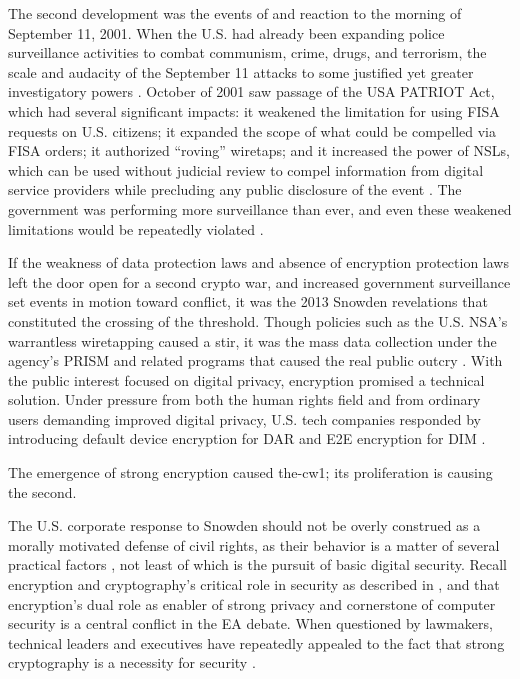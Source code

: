The second development was the events of and reaction to the morning of September 11, 2001. When the U.S. had already
been expanding police surveillance activities to combat communism, crime, drugs, and terrorism, the scale and audacity
of the September 11 attacks to some justified yet greater investigatory powers \cite{bloss_escalating_2007}. October of
2001 saw passage of the USA PATRIOT Act, which had several significant impacts: it weakened the limitation for using
\ac{FISA} requests on U.S. citizens; it expanded the scope of what could be compelled via \ac{FISA} orders; it
authorized ``roving'' wiretaps; and it increased the power of \acp{NSL}, which can be used without judicial review to
compel information from digital service providers while precluding any public disclosure of the event
\cite{sensenbrenner_2001} \cite{shamsi_2011}. The government was performing more surveillance than ever, and even these
weakened limitations would be repeatedly violated \cite{shamsi_2011} \cite{tucker_2020}.

If the weakness of data protection laws and absence of encryption protection laws left the door open for a second crypto
war, and increased government surveillance set events in motion toward conflict, it was the 2013 Snowden revelations
that constituted the crossing of the threshold. Though policies such as the U.S. \ac{NSA}'s warrantless wiretapping
caused a stir, it was the mass data collection under the agency's \ac{PRISM} and related programs that caused the real
public outcry \cite{landau_making_2013}. With the public interest focused on digital privacy, encryption promised a
technical solution. Under pressure from both the human rights field and from ordinary users demanding improved digital
privacy, U.S. tech companies responded by introducing default device encryption for \acl{DAR} and \acl{E2E} encryption
for \acl{DIM} \cite{treguer_us_2018}.

The emergence of strong encryption caused \ac{the-cw1}; its proliferation is causing the second.

The U.S. corporate response to Snowden should not be overly construed as a morally motivated defense of civil rights, as
their behavior is a matter of several practical factors \cite{treguer_us_2018}, not least of which is the pursuit of
basic digital security. Recall encryption and cryptography's critical role in security as described in
, and that encryption's dual role as enabler of strong privacy and cornerstone of computer
security is a central conflict in the \ac{EA} debate. When questioned by lawmakers, technical leaders and executives
have repeatedly appealed to the fact that strong cryptography is a necessity for security \cite{schulze_clipper_2017}.

